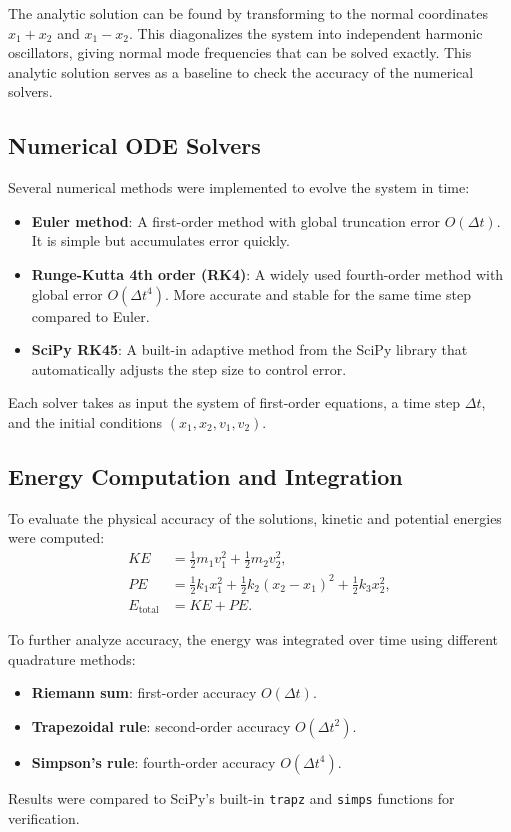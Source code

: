 \documentclass[12pt]{article}
\begin{document}
The analytic solution can be found by transforming to the normal coordinates $x_1 + x_2$ and $x_1 - x_2$. This diagonalizes the system into independent harmonic oscillators, giving normal mode frequencies that can be solved exactly. This analytic solution serves as a baseline to check the accuracy of the numerical solvers.

\subsection{Numerical ODE Solvers}
Several numerical methods were implemented to evolve the system in time:
\begin{itemize}
    \item \textbf{Euler method}: A first-order method with global truncation error $O(\Delta t)$. It is simple but accumulates error quickly.
    \item \textbf{Runge-Kutta 4th order (RK4)}: A widely used fourth-order method with global error $O(\Delta t^4)$. More accurate and stable for the same time step compared to Euler.
    \item \textbf{SciPy RK45}: A built-in adaptive method from the SciPy library that automatically adjusts the step size to control error.
\end{itemize}
Each solver takes as input the system of first-order equations, a time step $\Delta t$, and the initial conditions $(x_1, x_2, v_1, v_2)$.

\subsection{Energy Computation and Integration}
To evaluate the physical accuracy of the solutions, kinetic and potential energies were computed:
\begin{align}
    KE &= \tfrac{1}{2} m_1 v_1^2 + \tfrac{1}{2} m_2 v_2^2, \\
    PE &= \tfrac{1}{2} k_1 x_1^2 + \tfrac{1}{2} k_2 (x_2 - x_1)^2 + \tfrac{1}{2} k_3 x_2^2, \\
    E_{\text{total}} &= KE + PE.
\end{align}

To further analyze accuracy, the energy was integrated over time using different quadrature methods:
\begin{itemize}
    \item \textbf{Riemann sum}: first-order accuracy $O(\Delta t)$.
    \item \textbf{Trapezoidal rule}: second-order accuracy $O(\Delta t^2)$.
    \item \textbf{Simpson’s rule}: fourth-order accuracy $O(\Delta t^4)$.
\end{itemize}
Results were compared to SciPy’s built-in \texttt{trapz} and \texttt{simps} functions for verification.
\end{document}
